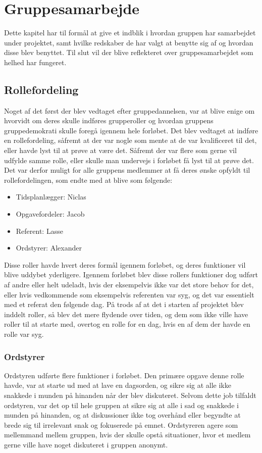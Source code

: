 \chapter{Gruppesamarbejde}\label{Gruppesamarbejde}
Dette kapitel har til formål at give et indblik i hvordan gruppen har samarbejdet under projektet, samt hvilke redskaber de har valgt at benytte sig af og hvordan disse blev benyttet. Til slut vil der blive reflekteret over gruppesamarbejdet som helhed har fungeret.

\section{Rollefordeling}\label{Rollefordeling-1}

Noget af det først der blev vedtaget efter gruppedannelsen, var at blive enige om hvorvidt om deres skulle indføres grupperoller og hvordan gruppens gruppedemokrati skulle foregå igennem hele forløbet. Det blev vedtaget at indføre en rollefordeling, såfremt at der var nogle som mente at de var kvalificeret til det, eller havde lyst til at prøve at være det. Såfremt der var flere som gerne vil udfylde samme rolle, eller skulle man undervejs i forløbet få lyst til at prøve det. Det var derfor muligt for alle gruppens medlemmer at få deres ønske opfyldt til rollefordelingen, som endte med at blive som følgende:

\begin{itemize}
\item Tidsplanlægger: Niclas
\item Opgavefordeler: Jacob
\item Referent: Lasse
\item Ordstyrer: Alexander
\end{itemize}

Disse roller havde hvert deres formål igennem forløbet, og deres funktioner vil blive uddybet yderligere. Igennem forløbet blev disse rollers funktioner dog udført af andre eller helt udeladt, hvis der eksempelvis ikke var det store behov for det, eller hvis vedkommende som eksempelvis referenten var syg, og det var essentielt med et referat den følgende dag. På trods af at det i starten af projektet blev inddelt roller, så blev det mere flydende over tiden, og dem som ikke ville have roller til at starte med, overtog en rolle for en dag, hvis en af dem der havde en rolle var syg.
	
\subsection*{Ordstyrer}\label{Ordstyrer-1}
Ordstyren udførte flere funktioner i forløbet. Den primære opgave denne rolle havde, var at starte ud med at lave en dagsorden, og sikre sig at alle ikke snakkede i munden på hinanden når der blev diskuteret. Selvom dette job tilfaldt ordstyren, var det op til hele gruppen at sikre sig at alle i sad og snakkede i munden på hinanden, og at diskussioner ikke tog overhånd eller begyndte at brede sig til irrelevant snak og fokuserede på emnet. Ordstyreren agere som mellemmand mellem gruppen, hvis der skulle opstå situationer, hvor et medlem gerne ville have noget diskuteret i gruppen anonymt. 

